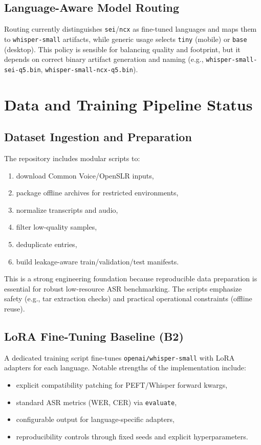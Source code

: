 \documentclass[11pt]{article}
\begin{document}
\subsection{Language-Aware Model Routing}
Routing currently distinguishes \texttt{sei}/\texttt{ncx} as fine-tuned languages and maps them to \texttt{whisper-small} artifacts, while generic usage selects \texttt{tiny} (mobile) or \texttt{base} (desktop). This policy is sensible for balancing quality and footprint, but it depends on correct binary artifact generation and naming (e.g., \texttt{whisper-small-sei-q5.bin}, \texttt{whisper-small-ncx-q5.bin}).

\section{Data and Training Pipeline Status}
\subsection{Dataset Ingestion and Preparation}
The repository includes modular scripts to:
\begin{enumerate}
    \item download Common Voice/OpenSLR inputs,
    \item package offline archives for restricted environments,
    \item normalize transcripts and audio,
    \item filter low-quality samples,
    \item deduplicate entries,
    \item build leakage-aware train/validation/test manifests.
\end{enumerate}

This is a strong engineering foundation because reproducible data preparation is essential for robust low-resource ASR benchmarking. The scripts emphasize safety (e.g., tar extraction checks) and practical operational constraints (offline reuse).

\subsection{LoRA Fine-Tuning Baseline (B2)}
A dedicated training script fine-tunes \texttt{openai/whisper-small} with LoRA adapters for each language. Notable strengths of the implementation include:
\begin{itemize}
    \item explicit compatibility patching for PEFT/Whisper forward kwargs,
    \item standard ASR metrics (WER, CER) via \texttt{evaluate},
    \item configurable output for language-specific adapters,
    \item reproducibility controls through fixed seeds and explicit hyperparameters.
\end{itemize}
\end{document}
